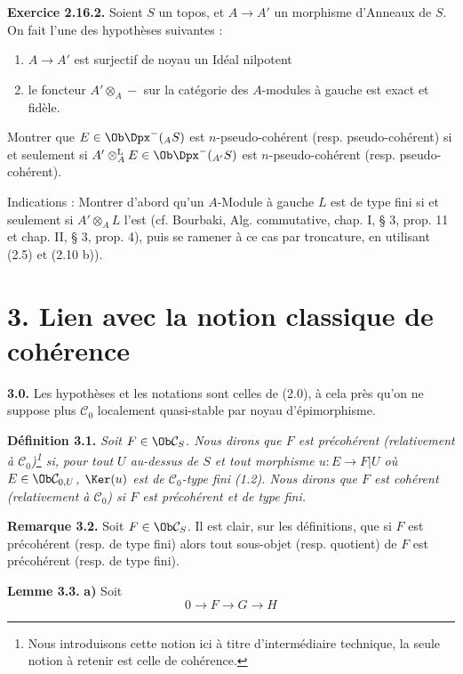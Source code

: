 \textbf{Exercice 2.16.2.} Soient \(S\) un topos, et \(A\to A'\) un morphisme d'Anneaux de \(S\). On fait l'une des hypothèses suivantes :
\begin{enumerate}[label=(\roman*)]
\item \(A\to A'\) est surjectif de noyau un Idéal nilpotent
\item le foncteur \(A'\otimes_A-\) sur la catégorie des \(A\)-modules à gauche est exact et fidèle.
\end{enumerate}
Montrer que \(E\in\Ob\Dpx^-(_A S)\) est \(n\)-pseudo-cohérent (resp. pseudo-cohérent) si et seulement si \(A'\otimes_A^{\mathrm L} E\in\Ob\Dpx^-(_{A'}S)\) est \(n\)-pseudo-cohérent (resp. pseudo-cohérent).

Indications : Montrer d'abord qu'un \(A\)-Module à gauche \(L\) est de type fini si et seulement si \(A'\otimes_A L\) l'est (cf. Bourbaki, Alg. commutative, chap. I, § 3, prop. 11 et chap. II, § 3, prop. 4), puis se ramener à ce cas par troncature, en utilisant (2.5) et (2.10 b)).

\section*{3. Lien avec la notion classique de cohérence}

\textbf{3.0.} Les hypothèses et les notations sont celles de (2.0), à cela près qu'on ne suppose plus \(\mathcal C_0\) localement quasi-stable par noyau d'épimorphisme.

\textbf{Définition 3.1.} \emph{Soit \(F\in\Ob\mathcal C_S\). Nous dirons que \(F\) est précohérent (relativement à \(\mathcal C_0\))\footnote{Nous introduisons cette notion ici à titre d'intermédiaire technique, la seule notion à retenir est celle de cohérence.} si, pour tout \(U\) au-dessus de \(S\) et tout morphisme \(u:E\to F|U\) où \(E\in\Ob\mathcal C_{0,U}\), \(\Ker(u)\) est de \(\mathcal C_0\)-type fini (1.2). Nous dirons que \(F\) est cohérent (relativement à \(\mathcal C_0\)) si \(F\) est précohérent et de type fini.}

\textbf{Remarque 3.2.} Soit \(F\in\Ob\mathcal C_S\). Il est clair, sur les définitions, que si \(F\) est précohérent (resp. de type fini) alors tout sous-objet (resp. quotient) de \(F\) est précohérent (resp. de type fini).

\textbf{Lemme 3.3.} \textbf{a)} Soit
\[
  0\longrightarrow F\longrightarrow G\longrightarrow H
\]
